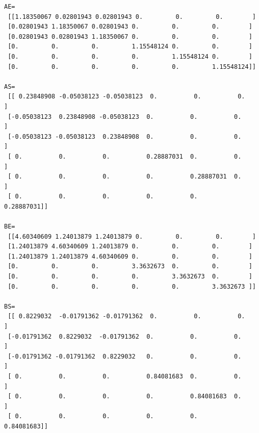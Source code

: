 \documentclass[
  a4paper,
  numbers=noendperiod,
  DIV=12]{scrreprt}
\begin{document}
\begin{verbatim}
AE=
 [[1.18350067 0.02801943 0.02801943 0.         0.         0.        ]
 [0.02801943 1.18350067 0.02801943 0.         0.         0.        ]
 [0.02801943 0.02801943 1.18350067 0.         0.         0.        ]
 [0.         0.         0.         1.15548124 0.         0.        ]
 [0.         0.         0.         0.         1.15548124 0.        ]
 [0.         0.         0.         0.         0.         1.15548124]] 

AS=
 [[ 0.23848908 -0.05038123 -0.05038123  0.          0.          0.        ]
 [-0.05038123  0.23848908 -0.05038123  0.          0.          0.        ]
 [-0.05038123 -0.05038123  0.23848908  0.          0.          0.        ]
 [ 0.          0.          0.          0.28887031  0.          0.        ]
 [ 0.          0.          0.          0.          0.28887031  0.        ]
 [ 0.          0.          0.          0.          0.          0.28887031]] 

BE=
 [[4.60340609 1.24013879 1.24013879 0.         0.         0.        ]
 [1.24013879 4.60340609 1.24013879 0.         0.         0.        ]
 [1.24013879 1.24013879 4.60340609 0.         0.         0.        ]
 [0.         0.         0.         3.3632673  0.         0.        ]
 [0.         0.         0.         0.         3.3632673  0.        ]
 [0.         0.         0.         0.         0.         3.3632673 ]] 

BS=
 [[ 0.8229032  -0.01791362 -0.01791362  0.          0.          0.        ]
 [-0.01791362  0.8229032  -0.01791362  0.          0.          0.        ]
 [-0.01791362 -0.01791362  0.8229032   0.          0.          0.        ]
 [ 0.          0.          0.          0.84081683  0.          0.        ]
 [ 0.          0.          0.          0.          0.84081683  0.        ]
 [ 0.          0.          0.          0.          0.          0.84081683]] 
\end{verbatim}
\end{document}
